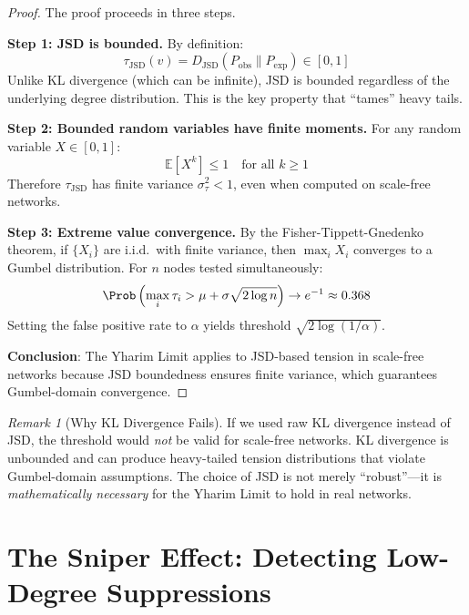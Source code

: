 \documentclass[11pt,a4paper]{article}
\theoremstyle{definition}
\theoremstyle{remark}
\newtheorem{remark}{Remark}[section]
\newcommand{\Djsd}{D_{\mathrm{JSD}}}
\begin{document}
\begin{proof}
The proof proceeds in three steps.

\textbf{Step 1: JSD is bounded.} By definition:
\begin{equation}
    \tau_{\text{JSD}}(v) = \Djsd(P_{\text{obs}} \| P_{\text{exp}}) \in [0, 1]
\end{equation}
Unlike KL divergence (which can be infinite), JSD is bounded regardless of the underlying degree distribution. This is the key property that ``tames'' heavy tails.

\textbf{Step 2: Bounded random variables have finite moments.} For any random variable $X \in [0, 1]$:
\begin{equation}
    \mathbb{E}[X^k] \leq 1 \quad \text{for all } k \geq 1
\end{equation}
Therefore $\tau_{\text{JSD}}$ has finite variance $\sigma_\tau^2 < 1$, even when computed on scale-free networks.

\textbf{Step 3: Extreme value convergence.} By the Fisher-Tippett-Gnedenko theorem, if $\{X_i\}$ are i.i.d.\ with finite variance, then $\max_i X_i$ converges to a Gumbel distribution. For $n$ nodes tested simultaneously:
\begin{equation}
    \Prob\left( \max_i \tau_i > \mu + \sigma \sqrt{2 \log n} \right) \to e^{-1} \approx 0.368
\end{equation}
Setting the false positive rate to $\alpha$ yields threshold $\sqrt{2\log(1/\alpha)}$.

\textbf{Conclusion}: The Yharim Limit applies to JSD-based tension in scale-free networks because JSD boundedness ensures finite variance, which guarantees Gumbel-domain convergence.
\end{proof}

\begin{remark}[Why KL Divergence Fails]
If we used raw KL divergence instead of JSD, the threshold would \emph{not} be valid for scale-free networks. KL divergence is unbounded and can produce heavy-tailed tension distributions that violate Gumbel-domain assumptions. The choice of JSD is not merely ``robust''---it is \emph{mathematically necessary} for the Yharim Limit to hold in real networks.
\end{remark}

\section{The Sniper Effect: Detecting Low-Degree Suppressions}
\end{document}
